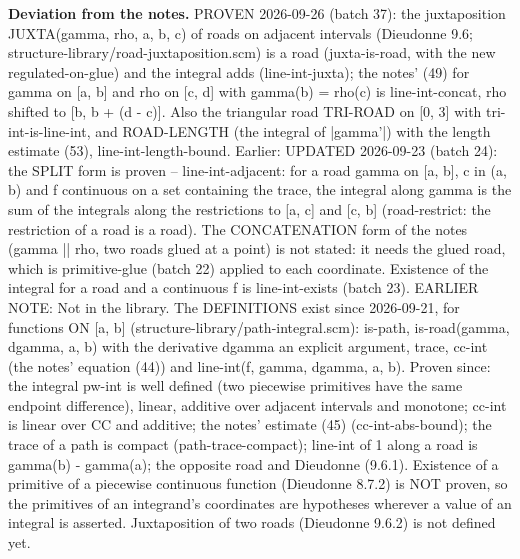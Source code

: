 \noindent\textbf{Deviation from the notes.} PROVEN 2026-09-26 (batch 37): the juxtaposition JUXTA(gamma, rho, a, b, c) of roads on adjacent intervals (Dieudonne 9.6; structure-library/road-juxtaposition.scm) is a road (juxta-is-road, with the new regulated-on-glue) and the integral adds (line-int-juxta); the notes' (49) for gamma on [a, b] and rho on [c, d] with gamma(b) = rho(c) is line-int-concat, rho shifted to [b, b + (d - c)]. Also the triangular road TRI-ROAD on [0, 3] with tri-int-is-line-int, and ROAD-LENGTH (the integral of |gamma'|) with the length estimate (53), line-int-length-bound. Earlier: UPDATED 2026-09-23 (batch 24): the SPLIT form is proven -- line-int-adjacent: for a road gamma on [a, b], c in (a, b) and f continuous on a set containing the trace, the integral along gamma is the sum of the integrals along the restrictions to [a, c] and [c, b] (road-restrict: the restriction of a road is a road). The CONCATENATION form of the notes (gamma || rho, two roads glued at a point) is not stated: it needs the glued road, which is primitive-glue (batch 22) applied to each coordinate. Existence of the integral for a road and a continuous f is line-int-exists (batch 23). EARLIER NOTE: Not in the library. The DEFINITIONS exist since 2026-09-21, for functions ON [a, b] (structure-library/path-integral.scm): is-path, is-road(gamma, dgamma, a, b) with the derivative dgamma an explicit argument, trace, cc-int (the notes' equation (44)) and line-int(f, gamma, dgamma, a, b). Proven since: the integral pw-int is well defined (two piecewise primitives have the same endpoint difference), linear, additive over adjacent intervals and monotone; cc-int is linear over CC and additive; the notes' estimate (45) (cc-int-abs-bound); the trace of a path is compact (path-trace-compact); line-int of 1 along a road is gamma(b) - gamma(a); the opposite road and Dieudonne (9.6.1). Existence of a primitive of a piecewise continuous function (Dieudonne 8.7.2) is NOT proven, so the primitives of an integrand's coordinates are hypotheses wherever a value of an integral is asserted. Juxtaposition of two roads (Dieudonne 9.6.2) is not defined yet.
%
\renewcommand{\thethm}{3.2}
